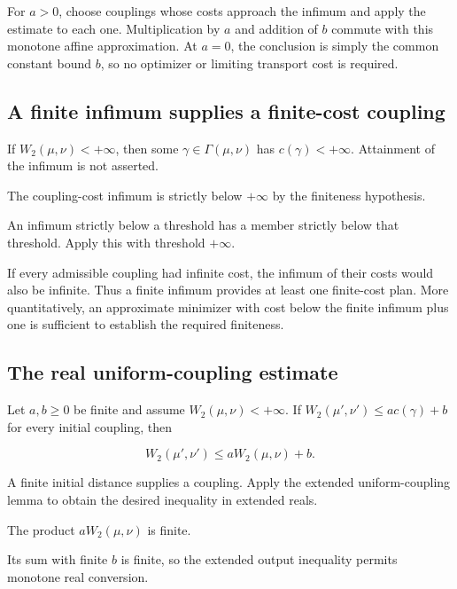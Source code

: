 \documentclass[11pt,a4paper]{article}
\begin{document}
For \(a>0\), choose couplings whose costs approach the infimum and apply the estimate to each one. Multiplication by \(a\) and addition of \(b\) commute with this monotone affine approximation. At \(a=0\), the conclusion is simply the common constant bound \(b\), so no optimizer or limiting transport cost is required.


\subsection{\texorpdfstring{A finite infimum supplies a finite-cost coupling}{A finite infimum supplies a finite-cost coupling}}


If \(W_2(\mu,\nu)<+\infty\), then some \(\gamma\in\Gamma(\mu,\nu)\) has \(c(\gamma)<+\infty\). Attainment of the infimum is not asserted.



The coupling-cost infimum is strictly below \(+\infty\) by the finiteness hypothesis.



An infimum strictly below a threshold has a member strictly below that threshold. Apply this with threshold \(+\infty\).



If every admissible coupling had infinite cost, the infimum of their costs would also be infinite. Thus a finite infimum provides at least one finite-cost plan. More quantitatively, an approximate minimizer with cost below the finite infimum plus one is sufficient to establish the required finiteness.


\subsection{\texorpdfstring{The real uniform-coupling estimate}{The real uniform-coupling estimate}}


Let \(a,b\ge0\) be finite and assume \(W_2(\mu,\nu)<+\infty\). If \(W_2(\mu',\nu')\le ac(\gamma)+b\) for every initial coupling, then

\[W_2(\mu',\nu')\le aW_2(\mu,\nu)+b.\]

A finite initial distance supplies a coupling. Apply the extended uniform-coupling lemma to obtain the desired inequality in extended reals.



The product \(aW_2(\mu,\nu)\) is finite.



Its sum with finite \(b\) is finite, so the extended output inequality permits monotone real conversion.
\end{document}
